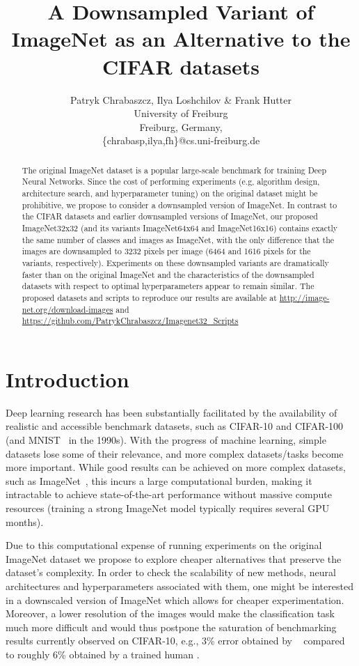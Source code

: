 \documentclass{article} \usepackage{iclr2017_conference,times}
\title{A Downsampled Variant
of ImageNet as an Alternative to the CIFAR datasets}
\author{Patryk Chrabaszcz, Ilya Loshchilov \& Frank Hutter \\
University of Freiburg\\
Freiburg, Germany,\\
\{chrabasp,ilya,fh\}@cs.uni-freiburg.de\\
}
\begin{document}
\maketitle

\begin{abstract}
The  original ImageNet dataset is a popular large-scale benchmark for training Deep Neural Networks. Since the cost of performing experiments (e.g, algorithm design, architecture search, and hyperparameter tuning) on the original dataset might be prohibitive, we propose to consider a downsampled version of ImageNet. In contrast to the CIFAR datasets and earlier downsampled versions of ImageNet, our proposed ImageNet32x32 (and its variants ImageNet64x64 and ImageNet16x16) contains exactly the same number of classes and images as ImageNet, with the only difference that the images are downsampled to 3232 pixels per image (6464 and 1616 pixels for the variants, respectively). Experiments on these downsampled variants are dramatically faster than on the original ImageNet and the characteristics of the downsampled datasets with respect to optimal hyperparameters appear to remain similar. The proposed datasets and scripts to reproduce our results are available at \linebreak \url{http://image-net.org/download-images} and  \linebreak   \url{https://github.com/PatrykChrabaszcz/Imagenet32_Scripts}
\end{abstract}

\section{Introduction}

Deep learning research has been substantially facilitated by the availability of realistic and accessible benchmark datasets, such as CIFAR-10 and CIFAR-100 \citep{krizhevsky2009learning} (and MNIST~\citep{lecun1998gradient} in the 1990s). With the progress of machine learning, simple datasets lose some of their relevance, and more complex datasets/tasks become more important. While good results can be achieved on more complex datasets, such as ImageNet~\citep{krizhevsky2012imagenet,ILSVRC15}, this incurs a large computational burden, making it intractable to achieve state-of-the-art performance without massive compute resources
(training a strong ImageNet model typically requires several GPU months). 

Due to this computational expense of running experiments on the original ImageNet dataset we propose to explore cheaper alternatives that preserve the dataset's complexity. 
In order to check the scalability of new methods, neural architectures and hyperparameters associated with them, one might be interested in a downscaled version of ImageNet which allows for cheaper experimentation. Moreover, a lower resolution of the images would make the classification task much more difficult and would thus postpone the saturation of benchmarking results currently observed on CIFAR-10, e.g., 3\% error obtained by ~\cite{shakeshake2017} compared to roughly 6\% obtained by a trained human \citep{KarpathyCIFAR10}. 
\end{document}
